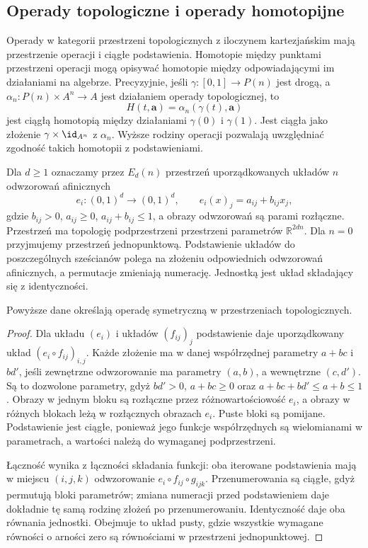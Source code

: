 \subsection{Operady topologiczne i operady homotopijne}

Operady w kategorii przestrzeni topologicznych z iloczynem kartezjańskim mają przestrzenie operacji i ciągłe podstawienia. Homotopie między punktami przestrzeni operacji mogą opisywać homotopie między odpowiadającymi im działaniami na algebrze. Precyzyjnie, jeśli $\gamma:[0,1]\to P(n)$ jest drogą, a $\alpha_n:P(n)\times A^n\to A$ jest działaniem operady topologicznej, to
\[
 H(t,\mathbf a)=\alpha_n(\gamma(t),\mathbf a)
\]
jest ciągłą homotopią między działaniami $\gamma(0)$ i $\gamma(1)$. Jest ciągła jako złożenie $\gamma\times\id_{A^n}$ z $\alpha_n$. Wyższe rodziny operacji pozwalają uwzględniać zgodność takich homotopii z podstawieniami.

\begin{definicja}\label{cat:def:little-cubes-operad}
Dla $d\geq1$ oznaczamy przez $E_d(n)$ przestrzeń uporządkowanych układów $n$ odwzorowań afinicznych
\[
 e_i:(0,1)^d\longrightarrow(0,1)^d,\qquad
 e_i(x)_j=a_{ij}+b_{ij}x_j,
\]
gdzie $b_{ij}>0$, $a_{ij}\geq0$, $a_{ij}+b_{ij}\leq1$, a obrazy odwzorowań są parami rozłączne. Przestrzeń ma topologię podprzestrzeni przestrzeni parametrów $\mathbb R^{2dn}$. Dla $n=0$ przyjmujemy przestrzeń jednopunktową. Podstawienie układów do poszczególnych sześcianów polega na złożeniu odpowiednich odwzorowań afinicznych, a permutacje zmieniają numerację. Jednostką jest układ składający się z identyczności.
\end{definicja}

\begin{stwierdzenie}\label{cat:prop:little-cubes-operad}
Powyższe dane określają operadę symetryczną w przestrzeniach topologicznych.
\end{stwierdzenie}
\begin{proof}
Dla układu $(e_i)$ i układów $(f_{ij})_j$ podstawienie daje uporządkowany układ $(e_i\circ f_{ij})_{i,j}$. Każde złożenie ma w danej współrzędnej parametry $a+bc$ i $bd'$, jeśli zewnętrzne odwzorowanie ma parametry $(a,b)$, a wewnętrzne $(c,d')$. Są to dozwolone parametry, gdyż $bd'>0$, $a+bc\geq0$ oraz $a+bc+bd'\leq a+b\leq1$. Obrazy w jednym bloku są rozłączne przez różnowartościowość $e_i$, a obrazy w różnych blokach leżą w rozłącznych obrazach $e_i$. Puste bloki są pomijane. Podstawienie jest ciągłe, ponieważ jego funkcje współrzędnych są wielomianami w parametrach, a wartości należą do wymaganej podprzestrzeni.

Łączność wynika z łączności składania funkcji: oba iterowane podstawienia mają w miejscu $(i,j,k)$ odwzorowanie $e_i\circ f_{ij}\circ g_{ijk}$. Przenumerowania są ciągłe, gdyż permutują bloki parametrów; zmiana numeracji przed podstawieniem daje dokładnie tę samą rodzinę złożeń po przenumerowaniu. Identyczność daje oba równania jednostki. Obejmuje to układ pusty, gdzie wszystkie wymagane równości o arności zero są równościami w przestrzeni jednopunktowej.
\end{proof}

